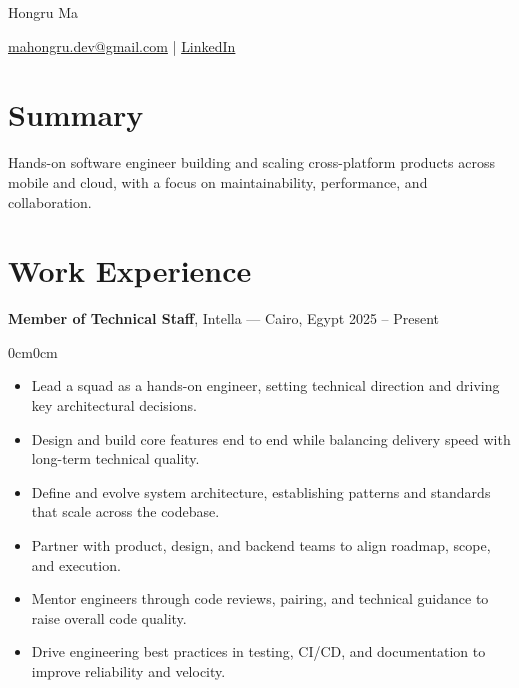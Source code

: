 \documentclass[11pt, letterpaper]{article}
\newenvironment{highlights}{
    \begin{itemize}[
        topsep=0.10cm,
        parsep=0.10cm,
        partopsep=0pt,
        itemsep=0pt,
        leftmargin=10pt
    ]
}{
    \end{itemize}
}
\newenvironment{onecolentry}{
    \begin{adjustwidth}{0cm}{0cm}
}{
    \end{adjustwidth}
}
\newenvironment{header}{
    \setlength{\topsep}{0pt}\par\kern\topsep\centering\linespread{1.5}
}{
    \par\kern\topsep
}
\begin{document}
\begin{header}
    \fontsize{24pt}{24pt}\selectfont Hongru Ma

    \vspace{5pt}

    \normalsize
    \kern 2.0pt%
    \mbox{\href{mailto:mahongru.dev@gmail.com}{mahongru.dev@gmail.com}}%
    \kern 2.0pt%
    |%
    \kern 2.0pt%
    \mbox{\href{https://www.linkedin.com/in/mahongru/}{LinkedIn}}%
    \kern 2.0pt%

\end{header}

\vspace{0.3cm}

\section{Summary}
\vspace{0.1cm}
Hands-on software engineer building and scaling cross-platform products across mobile and cloud, with a focus on maintainability, performance, and collaboration.
\vspace{0.1cm}

\section{Work Experience}

\textbf{Member of Technical Staff}, Intella — Cairo, Egypt \hfill 2025 – Present
\vspace{0.1cm}
\begin{onecolentry}
    \begin{highlights}
        \item Lead a squad as a hands-on engineer, setting technical direction and driving key architectural decisions.
        \item Design and build core features end to end while balancing delivery speed with long-term technical quality.
        \item Define and evolve system architecture, establishing patterns and standards that scale across the codebase.
        \item Partner with product, design, and backend teams to align roadmap, scope, and execution.
        \item Mentor engineers through code reviews, pairing, and technical guidance to raise overall code quality.
        \item Drive engineering best practices in testing, CI/CD, and documentation to improve reliability and velocity.
    \end{highlights}
\end{onecolentry}
\end{document}
